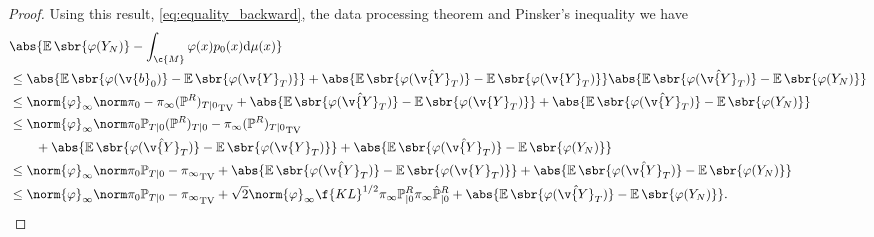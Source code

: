 \begin{proof}
	Using this result, \eqref{eq:equality_backward}, the data processing theorem \cite[Theorem 4.1]{kullback1997information} and Pinsker's inequality \cite[Equation 5.2.2]{bakry:gentil:ledoux:2014} we have \begin{align}  & {\abs{\E\sbr{\varphi(Y_N)} - \int_\c{M} \varphi(x) p_0(x) \mathrm{d} \mu(x)}} \\ & \leq \abs{\E\sbr{\varphi(\v{b}_0)} - \E\sbr{\varphi(\v{Y}_T)}} + \abs{\E\sbr{\varphi(\hat{\v{Y}}_T)} - \E\sbr{\varphi(\v{Y}_T)}} \abs{\E\sbr{\varphi(\hat{\v{Y}}_T)} - \E\sbr{\varphi(Y_N)}} \\ & \leq \norm{\varphi}_\infty \tvnorm{\pi_0 - \pi_{\infty} (\mathbb{P}^R)_{T|0}} + \abs{\E\sbr{\varphi(\hat{\v{Y}}_T)} - \E\sbr{\varphi(\v{Y}_T)}} + \abs{\E\sbr{\varphi(\hat{\v{Y}}_T)} - \E\sbr{\varphi(Y_N)}} \\ & \leq \norm{\varphi}_\infty \tvnorm{\pi_0 \bb{P}_{T|0} (\bb{P}^R)_{T|0} - \pi_{\infty} (\mathbb{P}^R)_{T|0}} \\& \qquad + \abs{\E\sbr{\varphi(\hat{\v{Y}}_T)} - \E\sbr{\varphi(\v{Y}_T)}} + \abs{\E\sbr{\varphi(\hat{\v{Y}}_T)} - \E\sbr{\varphi(Y_N)}} \\ & \leq \norm{\varphi}_\infty \tvnorm{\pi_0 \bb{P}_{T|0} - \pi_{\infty} } + \abs{\E\sbr{\varphi(\hat{\v{Y}}_T)} - \E\sbr{\varphi(\v{Y}_T)}} + \abs{\E\sbr{\varphi(\hat{\v{Y}}_T)} - \E\sbr{\varphi(Y_N)}} \\ & \leq \norm{\varphi}_\infty \tvnorm{\pi_0 \bb{P}_{T|0} - \pi_{\infty} } + \sqrt{2}\norm{\varphi}_\infty\f{KL}^{1/2}{\pi_{\infty}\bb{P}^R_{|0}}{\pi_{\infty}\hat{\bb{P}}^R_{|0}} + \abs{\E\sbr{\varphi(\hat{\v{Y}}_T)} - \E\sbr{\varphi(Y_N)}} .
	\end{align}


\end{proof}
